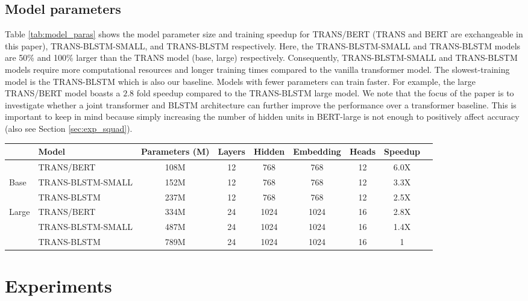 \documentclass[11pt,a4paper]{article}
\begin{document}
\subsection{Model parameters}
Table \ref{tab:model_paras} shows the model parameter size and training speedup for TRANS/BERT (TRANS and BERT are exchangeable in this paper), TRANS-BLSTM-SMALL, and TRANS-BLSTM respectively. 
Here, the TRANS-BLSTM-SMALL and TRANS-BLSTM models are 50\% and 100\% larger than the TRANS model (base, large) respectively. Consequently, TRANS-BLSTM-SMALL and TRANS-BLSTM models require more computational resources and longer training times compared to the vanilla transformer model. The slowest-training model is the TRANS-BLSTM which is also our baseline. Models with fewer parameters can train faster. For example, the large TRANS/BERT model boasts a $2.8$ fold speedup compared to the TRANS-BLSTM large model. We note that the focus of the paper is to investigate whether a joint transformer and BLSTM architecture can further improve the performance over a transformer baseline. This is important to keep in mind because simply increasing the number of hidden units in BERT-large is not enough to positively affect accuracy \cite{lan2019} (also see Section \ref{sec:exp_squad}). 

\begin{table*}[!hbpt]
\small
\centering
    \begin{tabular}{llccccccc}
  & Model & Parameters (M) & Layers & Hidden & Embedding & Heads & Speedup\\ \hline
   & TRANS/BERT & 108M & 12 & 768 & 768 & 12 & 6.0X\\
   Base & TRANS-BLSTM-SMALL & 152M & 12 & 768 & 768 & 12 & 3.3X \\
  & TRANS-BLSTM  & 237M & 12 & 768 & 768 & 12 & 2.5X \\ 
    \hline
    Large & TRANS/BERT & 334M & 24 & 1024 & 1024 & 16 & 2.8X\\
   & TRANS-BLSTM-SMALL & 487M &  24 & 1024 & 1024 & 16  & 1.4X\\ 
   & TRANS-BLSTM & 789M &  24 & 1024 & 1024  & 16 & 1\\ \hline
\end{tabular}
    \caption{Parameter size and training speed for TRANS/BERT, TRANS-BLSTM-SMALL, and TRANS-BLSTM on base and large settings respectively.}
\label{tab:model_paras}
\end{table*} 

\section{Experiments}
\end{document}
